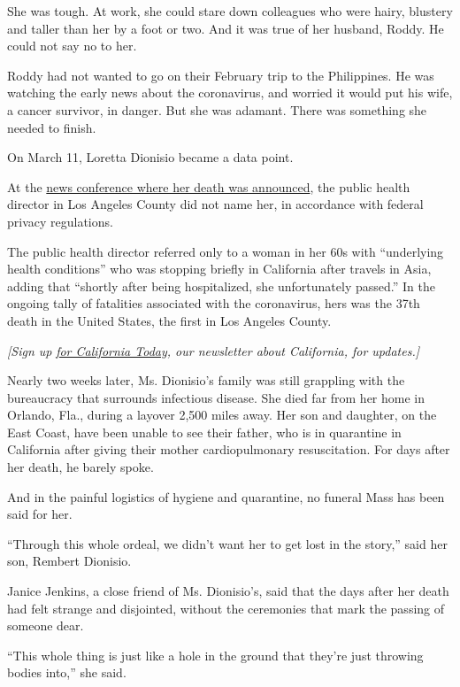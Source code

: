 She was tough. At work, she could stare down colleagues who were hairy,
blustery and taller than her by a foot or two. And it was true of her
husband, Roddy. He could not say no to her.

Roddy had not wanted to go on their February trip to the Philippines. He
was watching the early news about the coronavirus, and worried it would
put his wife, a cancer survivor, in danger. But she was adamant. There
was something she needed to finish.

On March 11, Loretta Dionisio became a data point.

At the
\href{https://www.dailybreeze.com/2020/03/11/la-county-reports-first-death-related-to-coronavirus-6-new-cases/}{news
conference where her death was announced}, the public health director in
Los Angeles County did not name her, in accordance with federal privacy
regulations.

The public health director referred only to a woman in her 60s with
``underlying health conditions'' who was stopping briefly in California
after travels in Asia, adding that ``shortly after being hospitalized,
she unfortunately passed.'' In the ongoing tally of fatalities
associated with the coronavirus, hers was the 37th death in the United
States, the first in Los Angeles County.

\emph{{[}Sign up}
\href{https://www.nytimes.com/newsletters/california-today}{\emph{for
California Today}}\emph{, our newsletter about California, for
updates.{]}}

Nearly two weeks later, Ms. Dionisio's family was still grappling with
the bureaucracy that surrounds infectious disease. She died far from her
home in Orlando, Fla., during a layover 2,500 miles away. Her son and
daughter, on the East Coast, have been unable to see their father, who
is in quarantine in California after giving their mother cardiopulmonary
resuscitation. For days after her death, he barely spoke.

And in the painful logistics of hygiene and quarantine, no funeral Mass
has been said for her.

``Through this whole ordeal, we didn't want her to get lost in the
story,'' said her son, Rembert Dionisio.

Janice Jenkins, a close friend of Ms. Dionisio's, said that the days
after her death had felt strange and disjointed, without the ceremonies
that mark the passing of someone dear.

``This whole thing is just like a hole in the ground that they're just
throwing bodies into,'' she said.

